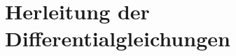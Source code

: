 \documentclass{article}
\title{\mytitle}
\author{\myauthor}
\newcommand{\TODO}{\textcolor{red}{ \textbf TODO }}
\begin{document}
\maketitle
\begin{abstract}
\TODO The abstract goes here.
\end{abstract}

\newpage
\section{Herleitung der Differentialgleichungen}

\end{document}
